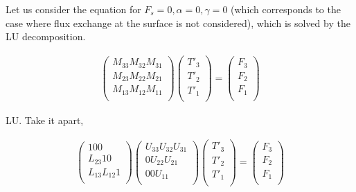 Let us consider the equation for \(F_s = 0, \alpha=0, \gamma=0\) (which
corresponds to the case where flux exchange at the surface is not
considered), which is solved by the LU decomposition.

\begin{eqnarray}
  \left( \begin{array}{lll} M_{33}  M_{32}  M_{31} \\ M_{23}
  M_{22}  M_{21} \\ M_{13}  M_{12}  M_{11} \\
         \end{array} \right)
  \left( \begin{array}{l}
         T'_3 \\ T'_2 \\ T'_1 \\
         \end{array} \right)
  =
  \left(  \begin{array}{l}
          F_3 \\ F_2 \\ F_1 \\
          \end{array} \right)
\end{eqnarray}

LU. Take it apart,

\begin{eqnarray}
  \left( \begin{array}{lll}
         1       0       0      \\
         L_{23}  1       0      \\
         L_{13}  L_{12}  1      \\
         \end{array} \right)
  \left( \begin{array}{lll}
         U_{33}  U_{32}  U_{31} \\
         0       U_{22}  U_{21} \\
         0       0       U_{11} \\
         \end{array} \right)
  \left( \begin{array}{l}
         T'_3 \\ T'_2 \\ T'_1 \\
         \end{array} \right)
  =
  \left(  \begin{array}{l}
          F_3 \\ F_2 \\ F_1 \\
          \end{array} \right)
\end{eqnarray}

